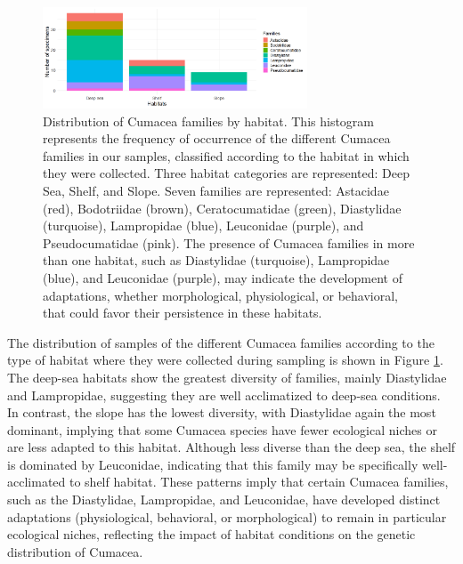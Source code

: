 {\begin{figure}[]
    \centering
    \includegraphics[width=0.7\textwidth]{figure4.png}
    \caption{Distribution of Cumacea families by habitat. This histogram represents the frequency of occurrence of the different Cumacea families in our samples, classified according to the habitat in which they were collected. Three habitat categories are represented: Deep Sea, Shelf, and Slope. Seven families are represented: Astacidae (red), Bodotriidae (brown), Ceratocumatidae (green), Diastylidae (turquoise), Lampropidae (blue), Leuconidae (purple), and Pseudocumatidae (pink). The presence of Cumacea families in more than one habitat, such as Diastylidae (turquoise), Lampropidae (blue), and Leuconidae (purple), may indicate the development of adaptations, whether morphological, physiological, or behavioral, that could favor their persistence in these habitats. \label{fig:fig5}}
\end{figure}

The distribution of samples of the different Cumacea families according to the type of habitat where they were collected during sampling is shown in Figure \ref{fig:fig5}. The deep-sea habitats show the greatest diversity of families, mainly Diastylidae and Lampropidae, suggesting they are well acclimatized to deep-sea conditions. In contrast, the slope has the lowest diversity, with Diastylidae again the most dominant, implying that some Cumacea species have fewer ecological niches or are less adapted to this habitat. Although less diverse than the deep sea, the shelf is dominated by Leuconidae, indicating that this family may be specifically well-acclimated to shelf habitat. These patterns imply that certain Cumacea families, such as the Diastylidae, Lampropidae, and Leuconidae, have developed distinct adaptations (physiological, behavioral, or morphological) to remain in particular ecological niches, reflecting the impact of habitat conditions on the genetic distribution of Cumacea.

}
